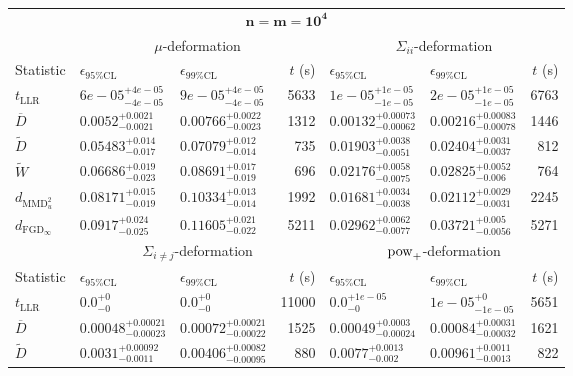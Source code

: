 \begin{tabular}{l|llr|llr}
	\toprule
	\multicolumn{7}{c}{$\mathbf{n=m=10^{4}}$} \\
	\multicolumn{1}{c}{} & \multicolumn{3}{c}{$\mu$-deformation} & \multicolumn{3}{c}{$\Sigma_{ii}$-deformation} \\
	Statistic & $\epsilon_{95\%\mathrm{CL}}$ & $\epsilon_{99\%\mathrm{CL}}$ & $t$ (s) & $\epsilon_{95\%\mathrm{CL}}$ & $\epsilon_{99\%\mathrm{CL}}$ & $t$ (s) \\
	\midrule
	$t_{\mathrm{LLR}}$ & $6e-05_{-4e-05}^{+4e-05}$ & $9e-05_{-4e-05}^{+4e-05}$ & 5633 & $1e-05_{-1e-05}^{+1e-05}$ & $2e-05_{-1e-05}^{+1e-05}$ & 6763 \\
	$\overline{D}$ & $0.0052_{-0.0021}^{+0.0021}$ & $0.00766_{-0.0023}^{+0.0022}$ & 1312 & $0.00132_{-0.00062}^{+0.00073}$ & $0.00216_{-0.00078}^{+0.00083}$ & 1446 \\
	$\widetilde{D}$ & $0.05483_{-0.017}^{+0.014}$ & $0.07079_{-0.014}^{+0.012}$ & 735 & $0.01903_{-0.0051}^{+0.0038}$ & $0.02404_{-0.0037}^{+0.0031}$ & 812 \\
	$\widetilde{W}$ & $0.06686_{-0.023}^{+0.019}$ & $0.08691_{-0.019}^{+0.017}$ & 696 & $0.02176_{-0.0075}^{+0.0058}$ & $0.02825_{-0.006}^{+0.0052}$ & 764 \\
	$d_{\mathrm{MMD}^{2}_{u}}$ & $0.08171_{-0.019}^{+0.015}$ & $0.10334_{-0.014}^{+0.013}$ & 1992 & $0.01681_{-0.0038}^{+0.0034}$ & $0.02112_{-0.0031}^{+0.0029}$ & 2245 \\
	$d_{\mathrm{FGD}_{\infty}}$ & $0.0917_{-0.025}^{+0.024}$ & $0.11605_{-0.022}^{+0.021}$ & 5211 & $0.02962_{-0.0077}^{+0.0062}$ & $0.03721_{-0.0056}^{+0.005}$ & 5271 \\
	\toprule
	\multicolumn{1}{c}{} & \multicolumn{3}{c}{$\Sigma_{i\neq j}$-deformation} & \multicolumn{3}{c}{$\rm{pow}_{+}$-deformation} \\
	Statistic & $\epsilon_{95\%\mathrm{CL}}$ & $\epsilon_{99\%\mathrm{CL}}$ & $t$ (s) & $\epsilon_{95\%\mathrm{CL}}$ & $\epsilon_{99\%\mathrm{CL}}$ & $t$ (s) \\
	\midrule
	$t_{\mathrm{LLR}}$ & $0.0_{-0}^{+0}$ & $0.0_{-0}^{+0}$ & 11000 & $0.0_{-0}^{+1e-05}$ & $1e-05_{-1e-05}^{+0}$ & 5651 \\
	$\overline{D}$ & $0.00048_{-0.00023}^{+0.00021}$ & $0.00072_{-0.00022}^{+0.00021}$ & 1525 & $0.00049_{-0.00024}^{+0.0003}$ & $0.00084_{-0.00032}^{+0.00031}$ & 1621 \\
	$\widetilde{D}$ & $0.0031_{-0.0011}^{+0.00092}$ & $0.00406_{-0.00095}^{+0.00082}$ & 880 & $0.0077_{-0.002}^{+0.0013}$ & $0.00961_{-0.0013}^{+0.0011}$ & 822 \\

\end{tabular}
